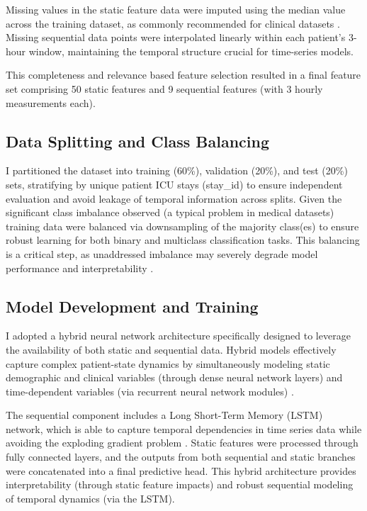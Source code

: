 \documentclass[conference]{IEEEtran}
\begin{document}
Missing values in the static feature data were imputed using the median value across the training dataset, as commonly recommended for clinical datasets \cite{harutyunyan2019multitask}. Missing sequential data points were interpolated linearly within each patient's 3-hour window, maintaining the temporal structure crucial for time-series models.

This completeness and relevance based feature selection resulted in a final feature set comprising 50 static features and 9 sequential features (with 3 hourly measurements each).

\subsection{Data Splitting and Class Balancing}

I partitioned the dataset into training (60\%), validation (20\%), and test (20\%) sets, stratifying by unique patient ICU stays (stay\_id) to ensure independent evaluation and avoid leakage of temporal information across splits. Given the significant class imbalance observed (a typical problem in medical datasets) training data were balanced via downsampling of the majority class(es) to ensure robust learning for both binary and multiclass classification tasks. This balancing is a critical step, as unaddressed imbalance may severely degrade model performance and interpretability \cite{japkowicz2002class}.

\subsection{Model Development and Training}

I adopted a hybrid neural network architecture specifically designed to leverage the availability of both static and sequential data. Hybrid models effectively capture complex patient-state dynamics by simultaneously modeling static demographic and clinical variables (through dense neural network layers) and time-dependent variables (via recurrent neural network modules) \cite{lipton2015critical,harutyunyan2019multitask}.

The sequential component includes a Long Short-Term Memory (LSTM) network, which is able to capture temporal dependencies in time series data while avoiding the exploding gradient problem \cite{hochreiter1997long}. Static features were processed through fully connected layers, and the outputs from both sequential and static branches were concatenated into a final predictive head. This hybrid architecture provides interpretability (through static feature impacts) and robust sequential modeling of temporal dynamics (via the LSTM).
\end{document}
